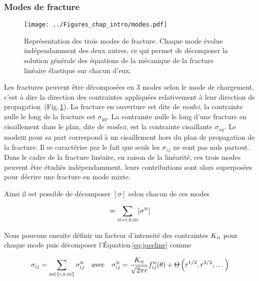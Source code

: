 \subsubsection{Modes de fracture}


\begin{figure}[htb]
\centering
\texttt{[image: ../Figures\_chap\_intro/modes.pdf]}
\caption[Modes de fracture]{Représentation des trois modes de fracture. Chaque mode évolue indépendamment des deux autres, ce qui permet de décomposer la solution générale des équations de la mécanique de la fracture linéaire élastique sur chacun d'eux.}
\label{fig:modes}
\end{figure}


Les fractures peuvent être décomposées en 3 modes selon le mode de chargement, c'est à dire la direction des contraintes appliquées relativement à leur direction de propagation\,\cite{freund_dynamic_1990,sun_fracture_2012} (Fig.\,\ref{fig:modes}). La fracture en ouverture est dite de \textit{mode\:\textsc{i}}, la contrainte nulle le long de la fracture est $\sigma_{yy}$. La contrainte nulle le long d'une fracture en cisaillement dans le plan, dite de \textit{mode\:\textsc{ii}}, est la contrainte cisaillante $\sigma_{xy}$. Le mode\:\textsc{iii} pour sa part correspond à un cisaillement hors du plan de propagation de la fracture. Il se caractérise par le fait que seuls les $\sigma_{zj}$ ne sont pas nuls partout. Dans le cadre de la fracture linéaire, en raison de la linéarité, ces trois modes peuvent être étudiés indépendamment, leurs contributions sont alors superposées pour décrire une fracture en mode mixte.

\newpage

Ainsi il est possible de décomposer $[\sigma]$ selon chacun de ces modes

\begin{equation}
[\sigma]=\sum_{\textsc{m}=\textsc{i,ii,iii}}[\sigma^\textsc{m}]
\end{equation}


Nous pouvons ensuite définir un facteur d'intensité des contraintes $K_\textsc{m}$ pour chaque mode puis décomposer l'Équation\,\ref{eq:joceline} comme

\begin{equation}
\sigma_{ij} = 
\sum_{\textsc{m}\in\{\textsc{i,ii,iii}\}}
\sigma_{ij}^\textsc{m}
\quad\text{avec}\quad
\sigma_{ij}^\textsc{m}=
\frac{K_\textsc{m}}{\sqrt{2\pi r}}f_{ij}^\textsc{m}(\theta)+\Theta\left(r^{1/2},r^{3/2},\dots\right)
\label{eq:sigmamodes}
\end{equation}





